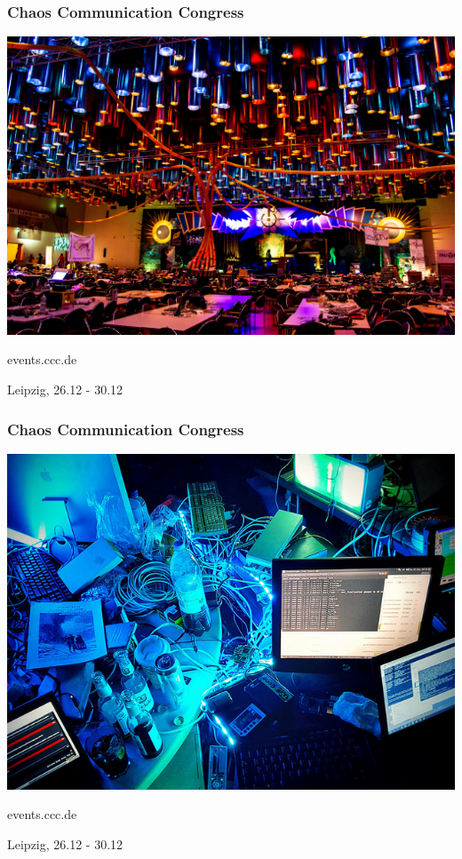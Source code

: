 \documentclass[12pt]{beamer}
\begin{document}
	\begin{frame}
		\frametitle{Chaos Communication Congress}
		\begin{center}
			\includegraphics[height=0.7\textheight]{img//congress_flickr_Willi_Thiel_cc_by-nc-sa_20.jpg}
			\vspace{10pt}		
			
			events.ccc.de

			Leipzig, 26.12 - 30.12
		\end{center}
	\end{frame}
	\begin{frame}
			\frametitle{Chaos Communication Congress}
			\begin{center}
				\includegraphics[height=0.7\textheight]{img//congress-chaos.jpg}
				\vspace{10pt}		
			
				events.ccc.de

				Leipzig, 26.12 - 30.12
			\end{center}
	\end{frame}	
\end{document}
